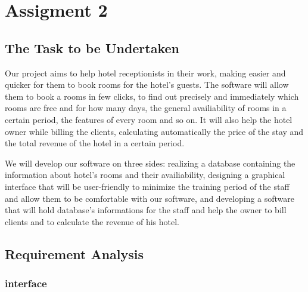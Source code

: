 
\section{Assigment 2}

\subsection{The Task to be Undertaken}
Our project aims to help hotel receptionists in their work, making easier and quicker for them to book rooms for the hotel's guests. The software will allow them to book a rooms in few clicks, to find out precisely and immediately which rooms are free and for how many days, the general availiability of rooms in a certain period, the features of every room and so on. It will also help the hotel owner while billing the clients, calculating automatically the price of the stay and the total revenue of the hotel in a certain period.

We will develop our software on three sides: realizing a database containing the information about hotel's rooms and their availiability, designing a graphical interface that will be user-friendly to minimize the training period of the staff and allow them to be comfortable with our software, and developing a software that will hold database's informations for the staff and help the owner to bill clients and to calculate the revenue of his hotel.

\subsection{Requirement Analysis}

\subsubsection{interface}

